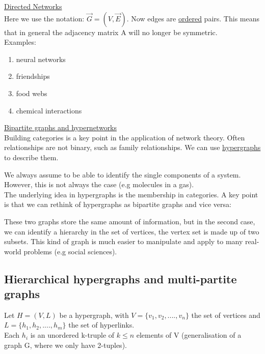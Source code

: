 \documentclass[11pt]{book}
\begin{document}
\underline{Directed Networks} \\
Here we use the notation: $\stackrel{\rightarrow}{G} = (V,\stackrel{\rightarrow}{E})$. Now edges are \underline{ordered} pairs. This means that in general the adjacency matrix A will no longer be symmetric.\\
Examples:
\begin{enumerate}
\item neural networks
\item friendships
\item food webs
\item chemical interactions
\end{enumerate}

\underline{Bipartite graphs and hypernetworks}\\
Building categories is a key point in the application of network theory. Often relationships are not binary, such as family relationships. We can use \underline{hypergraphs} to describe them.

\vspace{5 cm}

We always assume to be able to identify the single components of a system. However, this is not always the case (e.g molecules in a gas).\\

The underlying idea in hypergraphs is the membership in categories. A key point is that we can rethink of hypergraphs as bipartite graphs and vice versa:\\

\vspace{5cm}

These two graphs store the same amount of information, but in the second case, we can identify a hierarchy in the set of vertices, the vertex set is made up of two subsets. This kind of graph is much easier to manipulate and apply to many real-world problems (e.g social sciences).

\subsection{Hierarchical hypergraphs and multi-partite graphs}

Let $H=(V,L)$ be a hypergraph, with $V = \{v_{1},v_{2},....,v_{n}\}$ the set of vertices and  $L = \{h_{1},h_{2},....,h_{m}\}$ the set of hyperlinks.\\


Each $h_{i}$ is an unordered k-truple of $k \leq n$ elements of V (generalisation of a graph G, where we only have 2-tuples).\\
\end{document}
